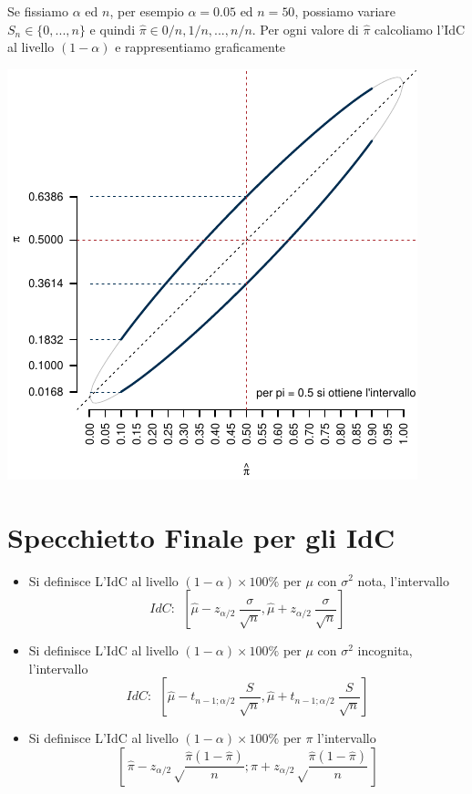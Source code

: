 \documentclass[
  11pt,
]{book}
\providecommand{\tightlist}{%
  \setlength{\itemsep}{0pt}\setlength{\parskip}{0pt}}
\theoremstyle{mytheoremstyle}
\theoremstyle{mydefstyle}
\begin{document}
Se fissiamo \(\alpha\) ed \(n\), per esempio \(\alpha=0.05\) ed \(n=50\), possiamo variare \(S_n\in\{0,...,n\}\) e quindi \(\hat\pi\in{0/n,1/n,...,n/n}\). Per ogni valore di \(\hat\pi\) calcoliamo l'IdC al livello \((1-\alpha)\) e rappresentiamo graficamente

\begin{center}\includegraphics{Appunti_di_Statistica_2025_files/figure-latex/13-stima-intervallare-18-1} \end{center}

\section{Specchietto Finale per gli IdC}\label{specchietto-finale-per-gli-idc}

\begin{info2}

\begin{itemize}
\tightlist
\item
  Si definisce L'IdC al livello \((1-\alpha)\times100\%\) per \(\mu\) con \(\sigma^2\) nota, l'intervallo
  \[IdC:~~\left[\hat \mu- z_{\alpha/2}~\frac\sigma{\sqrt n},\hat \mu+ z_{\alpha/2}~\frac\sigma{\sqrt n}\right]\]
\item
  Si definisce L'IdC al livello \((1-\alpha)\times100\%\) per \(\mu\) con \(\sigma^2\) incognita, l'intervallo
  \[IdC:~~\left[\hat \mu- t_{n-1;\alpha/2}~\frac S{\sqrt n},\hat \mu+ t_{n-1;\alpha/2}~\frac S{\sqrt n}\right]\]
\item
  Si definisce L'IdC al livello \((1-\alpha)\times100\%\) per \(\pi\) l'intervallo
  \[\left[\,\hat\pi-z_{\alpha/2}\sqrt\frac{\hat\pi(1-\hat\pi)}{n};\hat\pi+z_{\alpha/2}\sqrt\frac{\hat\pi(1-\hat\pi)}{n}\,\right]\]
\end{itemize}

\end{info2}
\end{document}
